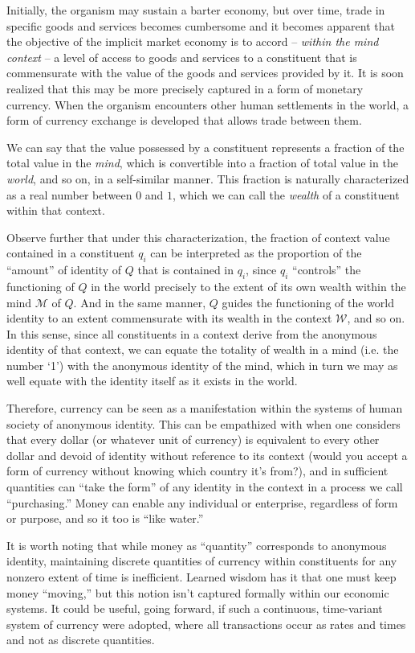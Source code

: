 \documentclass[pra,twocolumn,groupedaddress,10pt]{revtex4}
\theoremstyle{definition}
\begin{document}
Initially, the organism may sustain a barter economy, but over time, trade in specific goods and services becomes cumbersome and it becomes apparent that the objective of the implicit market economy is to accord -- \textit{within the mind context} -- a level of access to goods and services to a constituent that is commensurate with the value of the goods and services provided by it. It is soon realized that this may be more precisely captured in a form of monetary currency. When the organism encounters other human settlements in the world, a form of currency exchange is developed that allows trade between them.

We can say that the value possessed by a constituent represents a fraction of the total value in the \textit{mind}, which is convertible into a fraction of total value in the \textit{world}, and so on, in a self-similar manner. This fraction is naturally characterized as a real number between $0$ and $1$, which we can call the \textit{wealth} of a constituent within that context.

Observe further that under this characterization, the fraction of context value contained in a constituent $q_i$ can be interpreted as the proportion of the ``amount'' of identity of $Q$ that is contained in $q_{i}$, since $q_{i}$ ``controls'' the functioning of $Q$ in the world precisely to the extent of its own wealth within the mind $\mathcal{M}$ of $Q$. And in the same manner, $Q$ guides the functioning of the world identity to an extent commensurate with its wealth in the context $\mathcal{W}$, and so on. In this sense, since all constituents in a context derive from the anonymous identity of that context, we can equate the totality of wealth in a mind (i.e. the number `1') with the anonymous identity of the mind, which in turn we may as well equate with the identity itself as it exists in the world.

Therefore, currency can be seen as a manifestation within the systems of human society of anonymous identity. This can be empathized with when one considers that every dollar (or whatever unit of currency) is equivalent to every other dollar and devoid of identity without reference to its context (would you accept a form of currency without knowing which country it's from?), and in sufficient quantities can ``take the form'' of any identity in the context in a process we call ``purchasing.'' Money can enable any individual or enterprise, regardless of form or purpose, and so it too is ``like water.''

It is worth noting that while money as ``quantity'' corresponds to anonymous identity, maintaining discrete quantities of currency within constituents for any nonzero extent of time is inefficient. Learned wisdom has it that one must keep money ``moving,'' but this notion isn't captured formally within our economic systems. It could be useful, going forward, if such a continuous, time-variant system of currency were adopted, where all transactions occur as rates and times and not as discrete quantities.
\end{document}
